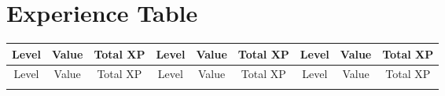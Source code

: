 \section{Experience Table}\label{sec:app-tab-xp}

\label{tab:app-xp}
\begin{longtable}[c]{ccc|ccc|ccc}
    \toprule%
    Level & Value & Total XP & Level & Value & Total XP & Level & Value & Total XP \\
    \midrule%
  \endhead%
    \toprule%
    Level & Value & Total XP & Level & Value & Total XP & Level & Value & Total XP \\
    \midrule%
  \endfirsthead%
    \bottomrule%
  \endfoot%
    \bottomrule%
  \endlastfoot%
    
\end{longtable}